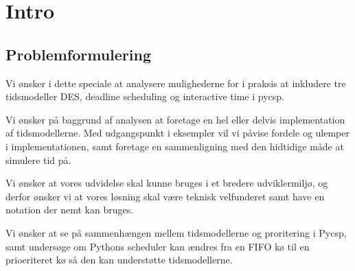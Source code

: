 



%
\chapter{Intro} 
\section{Problemformulering}


Vi ønsker i dette speciale at analysere mulighederne for i praksis at inkludere tre tidsmodeller DES, deadline scheduling og interactive time i pycsp.

Vi ønsker på baggrund af analysen at foretage en hel eller delvis implementation af tidsmodellerne. Med udgangspunkt i eksempler vil vi påvise fordele og ulemper i implementationen, samt foretage en sammenligning med den hidtidige måde at simulere tid på.

Vi ønsker at vores udvidelse skal kunne bruges i et bredere udviklermiljø, og derfor ønsker vi at vores løsning skal være teknisk velfunderet samt have en notation der nemt kan bruges.

Vi ønsker at se på sammenhængen mellem tidsmodellerne og proritering i Pycsp, samt undersøge om Pythons scheduler kan ændres fra en FIFO kø til en prioeriteret kø så den kan understøtte tidsmodellerne.

